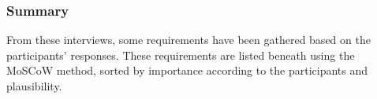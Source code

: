 







\subsubsection{Summary}
\label{sub:summary}
From these interviews, some requirements have been gathered based on the participants' responses. These requirements are listed beneath using the MoSCoW method, sorted by importance according to the participants and plausibility.
